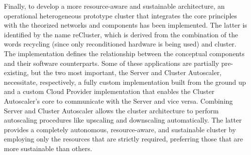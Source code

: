 Finally, to develop a more resource-aware and sustainable architecture, an
operational heterogeneous prototype cluster that integrates the core principles
with the theorized networks and components has been implemented. The latter is identified
by the name reCluster, which is derived from the combination of the words
recycling (since only reconditioned hardware is being used) and cluster. The implementation
defines the relationship between the conceptual components and their software counterparts.
Some of these applications are partially pre-existing, but the two most important,
the Server and Cluster Autoscaler, necessitate, respectively, a fully custom implementation
built from the ground up and a custom Cloud Provider implementation that enables
the Cluster Autoscaler's core to communicate with the Server and vice versa.
Combining Server and Cluster Autoscaler allows the cluster architecture to
perform autoscaling procedures like upscaling and downscaling automatically. The
latter provides a completely autonomous, resource-aware, and sustainable cluster
by employing only the resources that are strictly required, preferring those
that are more sustainable than others.